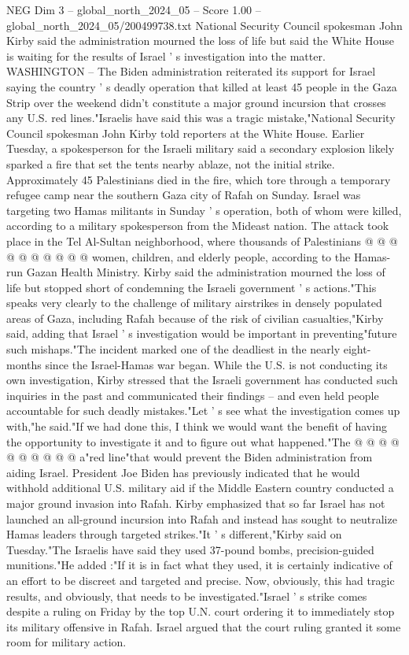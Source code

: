 \begin{textsample}{NEG Dim 3 – global\_north\_2024\_05 – Score 1.00 – global\_north\_2024\_05/200499738.txt}  \label{ex:f3_neg_441}
National Security Council spokesman John Kirby said the administration mourned the loss of life but said the White House is waiting for the results of Israel ' s investigation into the matter.
WASHINGTON -- The Biden administration reiterated its support for Israel saying the country ' s deadly operation that killed at least 45 people in the Gaza Strip over the weekend didn't constitute a major ground incursion that crosses any U.S. red lines."Israelis have said this was a tragic mistake,"National Security Council spokesman John Kirby told reporters at the White House.
Earlier Tuesday, a spokesperson for the Israeli military said a secondary explosion likely sparked a fire that set the tents nearby ablaze, not the initial strike.
Approximately 45 Palestinians died in the fire, which tore through a temporary refugee camp near the southern Gaza city of Rafah on Sunday.
Israel was targeting two Hamas militants in Sunday ' s operation, both of whom were killed, according to a military spokesperson from the Mideast nation.
The attack took place in the Tel Al-Sultan neighborhood, where thousands of Palestinians @ @ @ @ @ @ @ @ @ @ women, children, and elderly people, according to the Hamas-run Gazan Health Ministry.
Kirby said the administration mourned the loss of life but stopped short of condemning the Israeli government ' s actions."This speaks very clearly to the challenge of military airstrikes in densely populated areas of Gaza, including Rafah because of the risk of civilian casualties,"Kirby said, adding that Israel ' s investigation would be important in preventing"future such mishaps."The incident marked one of the deadliest in the nearly eight-months since the Israel-Hamas war began.
While the U.S. is not conducting its own investigation, Kirby stressed that the Israeli government has conducted such inquiries in the past and communicated their findings -- and even held people accountable for such deadly mistakes."Let ' s see what the investigation comes up with,"he said."If we had done this, I think we would want the benefit of having the opportunity to investigate it and to figure out what happened."The @ @ @ @ @ @ @ @ @ @ a"red line"that would prevent the Biden administration from aiding Israel.
President Joe Biden has previously indicated that he would withhold additional U.S. military aid if the Middle Eastern country conducted a major ground invasion into Rafah.
Kirby emphasized that so far Israel has not launched an all-ground incursion into Rafah and instead has sought to neutralize Hamas leaders through targeted strikes."It ' s different,"Kirby said on Tuesday."The Israelis have said they used 37-pound bombs, precision-guided munitions."He added :"If it is in fact what they used, it is certainly indicative of an effort to be discreet and targeted and precise.
Now, obviously, this had tragic results, and obviously, that needs to be investigated."Israel ' s strike comes despite a ruling on Friday by the top U.N. court ordering it to immediately stop its military offensive in Rafah.
Israel argued that the court ruling granted it some room for military action.

\end{textsample}
